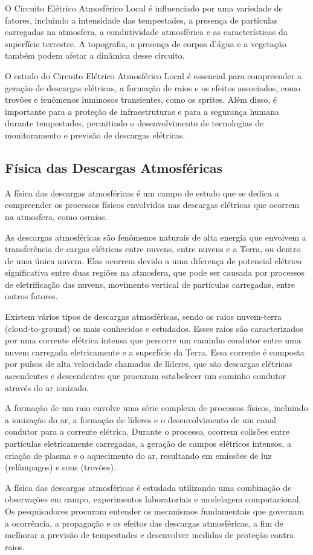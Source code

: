 \documentclass[a4paper, 12pt, onecolumn,singlespacing]{article}
\begin{document}
	O Circuito Elétrico Atmosférico Local é influenciado por uma variedade de fatores, incluindo a intensidade das tempestades, a presença de partículas carregadas na atmosfera, a condutividade atmosférica e as características da superfície terrestre. A topografia, a presença de corpos d'água e a vegetação também podem afetar a dinâmica desse circuito.
	
	O estudo do Circuito Elétrico Atmosférico Local é essencial para compreender a geração de descargas elétricas, a formação de raios e os efeitos associados, como trovões e fenômenos luminosos transientes, como os sprites. Além disso, é importante para a proteção de infraestruturas e para a segurança humana durante tempestades, permitindo o desenvolvimento de tecnologias de monitoramento e previsão de descargas elétricas.
	
	\subsection{Física das Descargas Atmosféricas}
	
	A física das descargas atmosféricas é um campo de estudo que se dedica a compreender os processos físicos envolvidos nas descargas elétricas que ocorrem na atmosfera, como osraios.
	
	As descargas atmosféricas são fenômenos naturais de alta energia que envolvem a transferência de cargas elétricas entre nuvens, entre nuvens e a Terra, ou dentro de uma única nuvem. Elas ocorrem	devido a uma diferença de potencial elétrico significativa entre duas regiões na atmosfera, que pode ser causada por processos de eletrificação das nuvens, movimento vertical de partículas carregadas,	entre outros fatores.
	
	Existem vários tipos de descargas atmosféricas, sendo os raios nuvem-terra (cloud-to-ground) os mais conhecidos e estudados. Esses raios são caracterizados por uma corrente elétrica intensa que percorre um caminho condutor entre uma nuvem carregada eletricamente e a superfície da Terra. Essa corrente é composta por pulsos de alta velocidade chamados de líderes, que são descargas elétricas ascendentes e descendentes que procuram estabelecer um caminho condutor através do ar ionizado.
	
	A formação de um raio envolve uma série complexa de processos físicos, incluindo a ionização do	ar, a formação de líderes e o desenvolvimento de um canal condutor para a corrente elétrica. Durante o processo, ocorrem colisões entre partículas eletricamente carregadas, a geração de campos elétricos intensos, a criação de plasma e o aquecimento do ar, resultando em emissões de luz (relâmpagos) e sons (trovões).
	
	A física das descargas atmosféricas é estudada utilizando uma combinação de observações em campo, experimentos laboratoriais e modelagem computacional. Os pesquisadores procuram entender os mecanismos fundamentais que governam a ocorrência, a propagação e os efeitos das descargas atmosféricas, a fim de melhorar a previsão de tempestades e desenvolver medidas de proteção contra	raios.
	
\end{document}
